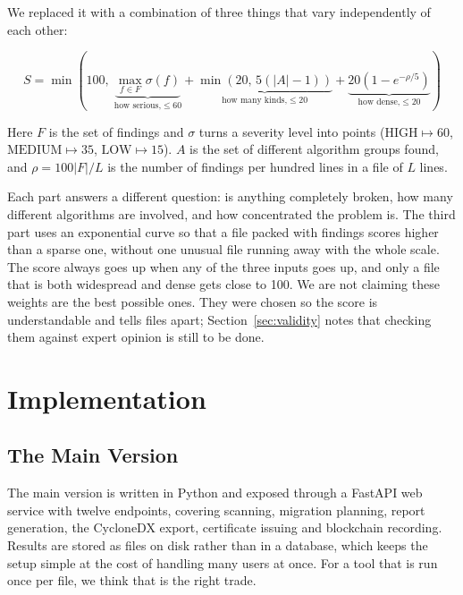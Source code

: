 \documentclass[runningheads]{llncs}
\begin{document}
We replaced it with a combination of three things that vary independently of
each other:

\begin{equation}
S = \min\!\left(100,\;
\underbrace{\max_{f \in F} \sigma(f)}_{\text{how serious,} \le 60} +
\underbrace{\min(20,\, 5(|A| - 1))}_{\text{how many kinds,} \le 20} +
\underbrace{20\left(1 - e^{-\rho/5}\right)}_{\text{how dense,} \le 20}
\right)
\label{eq:score}
\end{equation}

\noindent Here $F$ is the set of findings and $\sigma$ turns a severity level
into points ($\text{HIGH} \mapsto 60$, $\text{MEDIUM} \mapsto 35$,
$\text{LOW} \mapsto 15$). $A$ is the set of different algorithm groups found,
and $\rho = 100|F| / L$ is the number of findings per hundred lines in a file of
$L$ lines.

Each part answers a different question: is anything completely broken, how many
different algorithms are involved, and how concentrated the problem is. The
third part uses an exponential curve so that a file packed with findings scores
higher than a sparse one, without one unusual file running away with the whole
scale. The score always goes up when any of the three inputs goes up, and only
a file that is both widespread and dense gets close to 100. We are not claiming
these weights are the best possible ones. They were chosen so the score is
understandable and tells files apart; Section~\ref{sec:validity} notes that
checking them against expert opinion is still to be done.

\section{Implementation}
\label{sec:impl}

\subsection{The Main Version}

The main version is written in Python and exposed through a FastAPI web service
with twelve endpoints, covering scanning, migration planning, report
generation, the CycloneDX export, certificate issuing and blockchain
recording. Results are stored as files on disk rather than in a database, which
keeps the setup simple at the cost of handling many users at once. For a tool
that is run once per file, we think that is the right trade.
\end{document}
